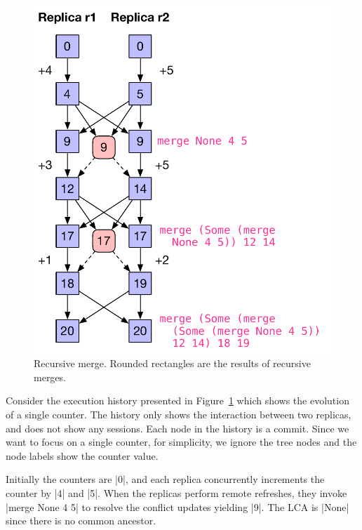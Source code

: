 \begin{figure}
	\centering
	\includegraphics[scale=0.45]{figures/recursive}
	\caption{Recursive merge. Rounded rectangles are the results of recursive
		merges.}
	\label{fig:recursive}
	\vspace{-0.9cm}
\end{figure}
Consider the execution history presented in Figure~\ref{fig:recursive} which
shows the evolution of a single counter. The history only shows the interaction
between two replicas, and does not show any sessions. Each node in the history
is a commit. Since we want to focus on a single counter, for simplicity, we
ignore the tree nodes and the node labels show the counter value.

Initially the counters are |0|, and each replica concurrently increments the
counter by |4| and |5|. When the replicas perform remote refreshes, they invoke
|merge None 4 5| to resolve the conflict updates yielding |9|. The LCA is
|None| since there is no common ancestor.

